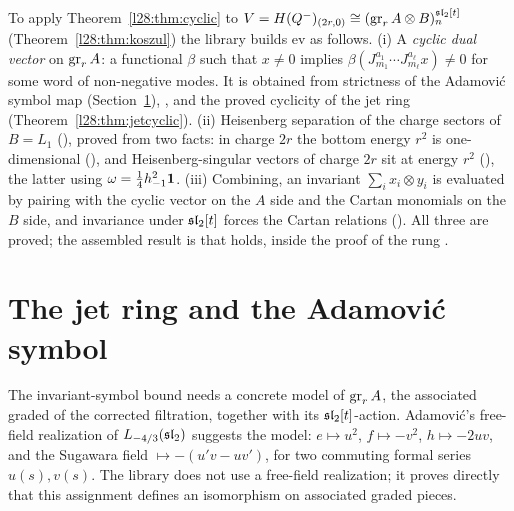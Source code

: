 \begin{remark}\label{l28:rem:assemble}
To apply Theorem~\ref{l28:thm:cyclic} to $V=H(Q^-)_{(2r,0)}\cong(\operatorname{gr}_rA\otimes B)^{\mathfrak{sl}_2[t]}_n$ (Theorem~\ref{l28:thm:koszul}) the library
builds $\mathrm{ev}$ as follows. (i) A \emph{cyclic dual vector} on $\operatorname{gr}_rA$: a functional $\beta$ such that $x\ne0$ implies
$\beta(J^{a_1}_{m_1}\cdots J^{a_\ell}_{m_\ell}x)\ne0$ for some word of non-negative modes. It is obtained from strictness of the Adamović symbol map
(Section~\ref{l28:sec:jet}), , and the proved cyclicity of the jet ring (Theorem~\ref{l28:thm:jetcyclic}). (ii) Heisenberg separation of
the charge sectors of $B=L_1$ (), proved from two facts: in charge $2r$ the bottom energy $r^2$ is one-dimensional
(), and Heisenberg-singular vectors of charge $2r$ sit at energy $r^2$ (), the latter using
$\omega=\tfrac14h_{-1}^2\mathbf 1$. (iii) Combining, an invariant $\sum_ix_i\otimes y_i$ is evaluated by pairing with the cyclic vector on the $A$ side
and the Cartan monomials on the $B$ side, and invariance under $\mathfrak{sl}_2[t]$ forces the Cartan relations (). All
three are proved; the assembled result is that  holds, inside the proof of the rung
.
\end{remark}

\section{The jet ring and the Adamovi\'c symbol}\label{l28:sec:jet}

The invariant-symbol bound needs a concrete model of $\operatorname{gr}_rA$, the associated graded of the corrected filtration, together with its
$\mathfrak{sl}_2[t]$-action. Adamović's free-field realization of $L_{-4/3}(\mathfrak{sl}_2)$ suggests the model: $e\mapsto u^2$, $f\mapsto-v^2$,
$h\mapsto-2uv$, and the Sugawara field $\mapsto-(u'v-uv')$, for two commuting formal series $u(s),v(s)$. The library does not use a free-field
realization; it proves directly that this assignment defines an isomorphism on associated graded pieces.

